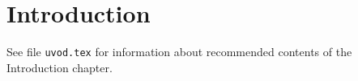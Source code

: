 \chapter*{Introduction} %

See file \verb'uvod.tex' for information about recommended contents of the Introduction chapter.
